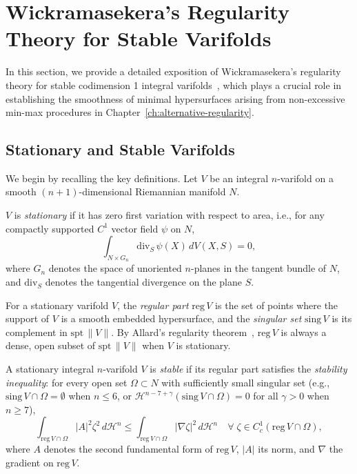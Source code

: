 \section{Wickramasekera's Regularity Theory for Stable Varifolds}\label{sec:wickramasekera-detailed}

In this section, we provide a detailed exposition of Wickramasekera's regularity theory for stable
codimension 1 integral varifolds~\cite{Wic14}, which plays a crucial role in establishing the
smoothness of minimal hypersurfaces arising from non-excessive min-max procedures in
Chapter~\ref{ch:alternative-regularity}.

\subsection{Stationary and Stable Varifolds}

We begin by recalling the key definitions. Let $V$ be an integral $n$-varifold on a smooth
$(n+1)$-dimensional Riemannian manifold $N$.

\begin{definition}\label{def:stationary-varifold}
$V$ is \emph{stationary} if it has zero first variation with respect to area, i.e., for any
compactly supported $C^1$ vector field $\psi$ on $N$,
\[
\int_{N \times G_n} \mathrm{div}_{S} \,\psi(X) \, dV(X, S) = 0,
\]
where $G_n$ denotes the space of unoriented $n$-planes in the tangent bundle of $N$, and
$\mathrm{div}_S$ denotes the tangential divergence on the plane $S$.
\end{definition}

For a stationary varifold $V$, the \emph{regular part} $\mathrm{reg}\, V$ is the set of points where
the support of $V$ is a smooth embedded hypersurface, and the \emph{singular set}
$\mathrm{sing}\, V$ is its complement in $\mathrm{spt}\,\|V\|$. By Allard's regularity
theorem~\cite{AW}, $\mathrm{reg}\, V$ is always a dense, open subset of $\mathrm{spt}\,\|V\|$ when
$V$ is stationary.

\begin{definition}\label{def:stable-varifold}
A stationary integral $n$-varifold $V$ is \emph{stable} if its regular part satisfies the
\emph{stability inequality}: for every open set $\Omega \subset N$ with sufficiently small
singular set (e.g., $\mathrm{sing}\, V \cap \Omega = \emptyset$ when $n \leq 6$, or
${\mathcal H}^{n-7+\gamma}(\mathrm{sing}\, V \cap \Omega) = 0$ for all $\gamma > 0$ when $n \geq 7$),
\begin{equation}\label{eq:stability-detailed}
\int_{\mathrm{reg} \, V \cap \Omega} |A|^{2}\zeta^{2} \,d{\mathcal H}^{n} \leq
\int_{\mathrm{reg} \, V \cap \Omega} |\nabla \zeta|^{2} \, d{\mathcal H}^{n}
\quad \forall \; \zeta \in C^{1}_{c}(\mathrm{reg} \, V \cap \Omega),
\end{equation}
where $A$ denotes the second fundamental form of $\mathrm{reg}\, V$, $|A|$ its norm, and $\nabla$
the gradient on $\mathrm{reg}\, V$.
\end{definition}

